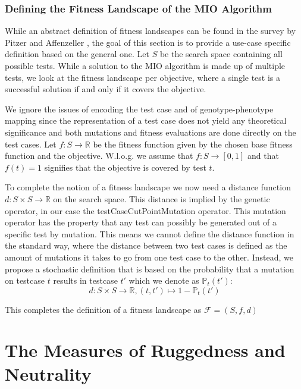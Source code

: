\documentclass[
  a4paper,  %
  twoside,  %
  bibliography=totoc,
  headsepline,
  cleardoublepage=empty,
  parskip=half,
  draft=false
]{scrbook}
\begin{document}
\subsubsection{Defining the Fitness Landscape of the MIO Algorithm}

While an abstract definition of fitness landscapes can be found in the survey by Pitzer and Affenzeller \cite{pitzer2012comprehensive}, the goal of this section is to provide a use-case specific definition based on the general one.
Let $S$ be the search space containing all possible tests.
While a solution to the MIO algorithm is made up of multiple tests, we look at the fitness landscape per objective, where a single test is a successful solution if and only if it covers the objective.

We ignore the issues of encoding the test case and of genotype-phenotype mapping since the representation of a test case does not yield any theoretical significance and both mutations and fitness evaluations are done directly on the test cases. 
Let $f: S \rightarrow \mathbb{R}$ be the fitness function given by the chosen base fitness function and the objective.
W.l.o.g. we assume that $f: S \rightarrow [0, 1]$ and that $f(t) = 1$ signifies that the objective is covered by test $t$.

To complete the notion of a fitness landscape we now need a distance function $d: S \times S \rightarrow \mathbb{R}$ on the search space.
This distance is implied by the genetic operator, in our case the testCaseCutPointMutation operator.
This mutation operator has the property that any test can possibly be generated out of a specific test by mutation.
This means we cannot define the distance function in the standard way, where the distance between two test cases is defined as the amount of mutations it takes to go from one test case to the other.
Instead, we propose a stochastic definition that is based on the probability that a mutation on testcase $t$ results in testcase $t'$ which we denote as $\mathbb{P}_t(t')$:
\begin{equation}
	d: S \times S \rightarrow \mathbb{R},
	(t, t') \mapsto 1 - \mathbb{P}_t(t')
\end{equation}

This completes the definition of a fitness landscape as $\mathcal{F} = (S, f, d)$

\section{The Measures of Ruggedness and Neutrality}\label{sec:measures}
\end{document}
